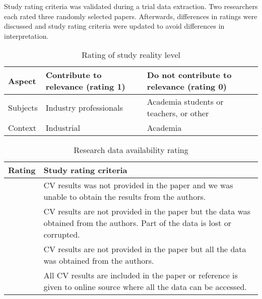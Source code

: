 
Study rating criteria was validated during a trial data extraction. Two researchers each rated three randomly selected papers. Afterwards, differences in ratings were discussed and study rating criteria were updated to avoid differences in interpretation.

\begin{table}
\caption{\label{tab:Study-Setting-Rating}Rating of study reality level}
\begin{tabular}{|>{\centering}p{}|>{\centering}p{}|>{\centering}p{}|}
\hline 
Aspect & Contribute to relevance (rating 1) & Do not contribute to relevance (rating 0)\tabularnewline
\hline\hline
Subjects & Industry professionals & Academia students or teachers, or other\tabularnewline
\hline 
Context & Industrial & Academia\tabularnewline
\hline 
\end{tabular}%
\end{table}

\begin{table}
\caption{\label{tab:Research-Data-Availability}Research data availability rating}
\begin{tabular}{|>{\centering}p{}|>{\raggedright}p{}|}
\hline 
Rating & \centering{}Study rating criteria\tabularnewline
\hline \hline
0 & CV results was not provided in the paper and we was unable to obtain
the results from the authors.\tabularnewline
\hline 
1 & CV results are not provided in the paper but the data was obtained
from the authors. Part of the data is lost or corrupted.\tabularnewline
\hline 
2 & CV results are not provided in the paper but all the data was obtained
from the authors.\tabularnewline
\hline 
3 & All CV results are included in the paper or reference is given to
online source where all the data can be accessed.\tabularnewline
\hline
\end{tabular}%
\end{table}

